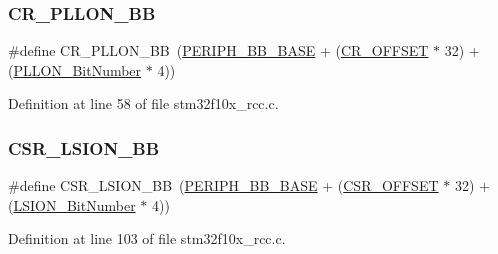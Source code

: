 \subsubsection{\texorpdfstring{C\+R\+\_\+\+P\+L\+L\+O\+N\+\_\+\+BB}{CR\_PLLON\_BB}}
{\footnotesize\ttfamily \#define C\+R\+\_\+\+P\+L\+L\+O\+N\+\_\+\+BB~(\hyperlink{group___peripheral__memory__map_gaed7efc100877000845c236ccdc9e144a}{P\+E\+R\+I\+P\+H\+\_\+\+B\+B\+\_\+\+B\+A\+SE} + (\hyperlink{group___r_c_c___private___defines_gafa1d3d0ea72132df651c76fc1bdffffc}{C\+R\+\_\+\+O\+F\+F\+S\+ET} $\ast$ 32) + (\hyperlink{group___r_c_c___private___defines_gab24d7f5f8e4b3b717fd91b54f393f6a3}{P\+L\+L\+O\+N\+\_\+\+Bit\+Number} $\ast$ 4))}



Definition at line 58 of file stm32f10x\+\_\+rcc.\+c.

\mbox{\label{group___r_c_c___private___defines_gaa253e36e7e5fb02998c0e4d0388abc52}} 
\subsubsection{\texorpdfstring{C\+S\+R\+\_\+\+L\+S\+I\+O\+N\+\_\+\+BB}{CSR\_LSION\_BB}}
{\footnotesize\ttfamily \#define C\+S\+R\+\_\+\+L\+S\+I\+O\+N\+\_\+\+BB~(\hyperlink{group___peripheral__memory__map_gaed7efc100877000845c236ccdc9e144a}{P\+E\+R\+I\+P\+H\+\_\+\+B\+B\+\_\+\+B\+A\+SE} + (\hyperlink{group___r_c_c___private___defines_ga984cbe73312b6d3d355c5053763d499a}{C\+S\+R\+\_\+\+O\+F\+F\+S\+ET} $\ast$ 32) + (\hyperlink{group___r_c_c___private___defines_ga3f9dbe50769ce2a63ae12520433b9b40}{L\+S\+I\+O\+N\+\_\+\+Bit\+Number} $\ast$ 4))}



Definition at line 103 of file stm32f10x\+\_\+rcc.\+c.

\mbox{\label{group___r_c_c___private___defines_ga984cbe73312b6d3d355c5053763d499a}} 
